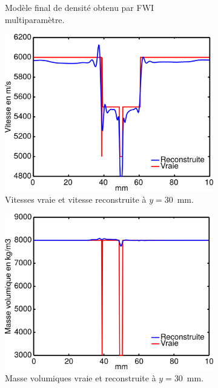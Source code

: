 \begin{figure}[!h]
\begin{subfigure}[b]{0.4\textwidth}
		\caption{Modèle final de densité obtenu par FWI multiparamètre.}
	\end{subfigure}
	\begin{subfigure}[b]{0.4\textwidth}
		\includegraphics[width=\textwidth]{img/multi_param/coupe_vp_multi.png}
		\caption{Vitesses vraie et vitesse reconstruite à $y=30$~mm.}
	\end{subfigure}
	\begin{subfigure}[b]{0.4\textwidth}
		\includegraphics[width=\textwidth]{img/multi_param/coupe_rho_multi.png}
		\caption{Masse volumiques vraie et reconstruite à $y=30$~mm.}
	\end{subfigure}
	\begin{subfigure}[b]{0.4\textwidth}

\end{subfigure}
\end{figure}
